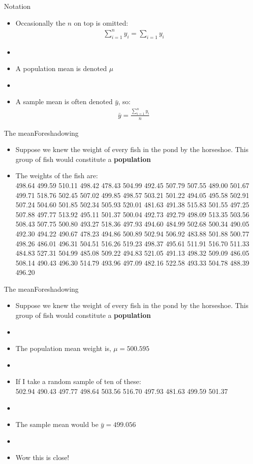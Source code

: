 \documentclass[xcolor=dvipsnames]{beamer}
\begin{document}
\begin{frame}{Notation}
	\begin{itemize}
		\item Occasionally the $n$ on top is omitted:
		\begin{gather*}
		\sum_{i=1}^{n} y_i = \sum_{i=1} y_i 
		\end{gather*} \pause
		\item[]
		\item A population mean is denoted $\mu$ \pause
		\item[]
		\item A sample mean is often denoted $\bar{y}$, so:
		\begin{gather*}
		\bar{y} = \frac{\sum_{i=1}^{n} y_i}{n}
		\end{gather*}
	\end{itemize}
\end{frame}

\begin{frame}{The mean}{Foreshadowing}
	\begin{itemize}
		\item Suppose we knew the weight of every fish in the pond by the horseshoe. This group of fish would constitute a \textbf{population} \pause
		\item The weights of the fish are: \\
 498.64 499.59 510.11 498.42 478.43 504.99 492.45 507.79 507.55 489.00 501.67 499.71 518.76 502.45 507.02 499.85
498.57 503.21 501.22 494.05 495.58 502.91 507.24 504.60 501.85 502.34 505.93 520.01 481.63 491.38 515.83 501.55
 497.25 507.88 497.77 513.92 495.11 501.37 500.04 492.73 492.79 498.09 513.35 503.56 508.43 507.75 500.80 493.27
518.36 497.93 494.60 484.99 502.68 500.34 490.05 492.30 494.22 490.67 478.23 494.86 500.89 502.94 506.92 483.88
501.88 500.77 498.26 486.01 496.31 504.51 516.26 519.23 498.37 495.61 511.91 516.70 511.33 484.83 527.31 504.99
 485.08 509.22 494.83 521.05 491.13 498.32 509.09 486.05 508.14 490.43 496.30 514.79 493.96 497.09 482.16 522.58
 493.33 504.78 488.39 496.20
	\end{itemize}
\end{frame}

\begin{frame}{The mean}{Foreshadowing}
	\begin{itemize}
		\item Suppose we knew the weight of every fish in the pond by the horseshoe. This group of fish would constitute a \textbf{population} \pause
		\item[]
		\item The population mean weight is, $\mu = 500.595$ \pause
		\item[]
		\item If I take a random sample of ten of these: \\
		502.94 490.43 497.77 498.64 503.56 516.70 497.93 481.63 499.59 501.37 \pause
		\item[]
		\item The sample mean would be $\bar{y} = 499.056$
		\item[]
		\item Wow this is close!
	\end{itemize}
\end{frame}
\end{document}
